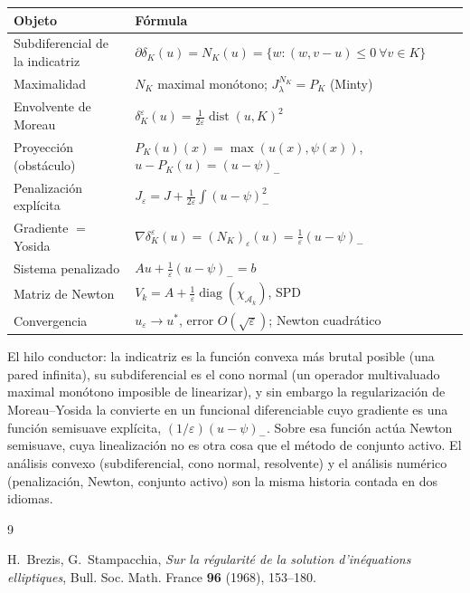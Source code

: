 \documentclass[11pt,a4paper]{article}
\theoremstyle{definition}
\theoremstyle{remark}
\DeclareMathOperator{\dist}{dist}
\begin{document}
\begin{observación}
\begin{observación}
\begin{center}
\renewcommand{\arraystretch}{1.35}
\begin{tabular}{@{}ll@{}}
\toprule
\textbf{Objeto} & \textbf{Fórmula} \\
\midrule
Subdiferencial de la indicatriz &
$\partial \delta_K(u) = N_K(u) = \{ w : (w, v-u) \le 0 \ \forall v \in K\}$ \\
Maximalidad & $N_K$ maximal monótono; $J_\lambda^{N_K} = P_K$ (Minty) \\
Envolvente de Moreau &
$\delta_K^\varepsilon(u) = \frac{1}{2\varepsilon}\dist(u,K)^2$ \\
Proyección (obstáculo) &
$P_K(u)(x) = \max(u(x), \psi(x))$, \quad $u - P_K(u) = (u-\psi)_-$ \\
Penalización explícita &
$J_\varepsilon = J + \frac{1}{2\varepsilon}\int (u-\psi)_-^2$ \\
Gradiente $=$ Yosida &
$\nabla \delta_K^\varepsilon(u) = (N_K)_\varepsilon(u)
= \frac{1}{\varepsilon}(u - \psi)_-$ \\
Sistema penalizado &
$A u + \frac{1}{\varepsilon}(u-\psi)_- = b$ \\
Matriz de Newton &
$V_k = A + \frac{1}{\varepsilon}\operatorname{diag}(\chi_{\mathcal{A}_k})$,
\quad SPD \\
Convergencia & $u_\varepsilon \to u^\ast$, error $O(\sqrt{\varepsilon})$;
Newton cuadrático \\
\bottomrule
\end{tabular}
\end{center}

El hilo conductor: la indicatriz es la función convexa más brutal posible
(una pared infinita), su subdiferencial es el cono normal (un operador
multivaluado maximal monótono imposible de linearizar), y sin embargo la
regularización de Moreau--Yosida la convierte en un funcional diferenciable
cuyo gradiente es una función semisuave explícita, $(1/\varepsilon)
(u-\psi)_-$. Sobre esa función actúa Newton semisuave, cuya linealización
no es otra cosa que el método de conjunto activo. El análisis convexo
(subdiferencial, cono normal, resolvente) y el análisis numérico
(penalización, Newton, conjunto activo) son la misma historia contada
en dos idiomas.

\begin{thebibliography}{9}

H.~Brezis, G.~Stampacchia,
\emph{Sur la régularité de la solution d'inéquations elliptiques},
Bull. Soc. Math. France \textbf{96} (1968), 153--180.


\end{thebibliography}
\end{observación}
\end{observación}
\end{document}

